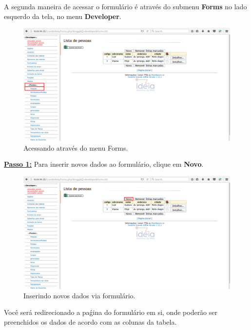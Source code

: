 \documentclass[9pt]{report}
\begin{document}
{      A segunda maneira de acessar o formulário é através do submenu
      \textbf{Forms} no lado esquerdo da tela, no menu
      \textbf{Developer}.

      \begin{figure}[H]
        \includegraphics[width=\textwidth]{2_Formularios/2_Criacao_de_formularios/14.png}
        \caption{Acessando através do menu Forms.}
        \label{fig:Forms}
      \end{figure}

      \underline{\textbf{Passo 1:}} Para inserir novos dados ao
      formulário, clique em \textbf{Novo}.

      \begin{figure}[H]
        \includegraphics[width=\textwidth]{2_Formularios/2_Criacao_de_formularios/15.png}
        \caption{Inserindo novos dados via formulário.}
        \label{fig:novosdados}
      \end{figure}
      
      Você será redirecionado a paǵina do formulário em si, onde
      poderão ser preenchidos os dados de acordo com as colunas da
      tabela.
      
}
\end{document}
